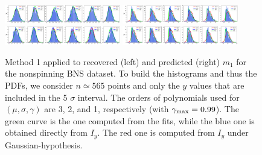 \documentclass[prd,aps,twocolumn,a4paper,showkeys,nofootinbib]{revtex4-1}
\def\Iy{{I_y}}
\begin{document}
\begin{figure}[t]
	\includegraphics[width=0.45\textwidth]{./FigsErr/v1_BNS_rec_m1_distr3.png}
	\hspace{0.8cm}
	\includegraphics[width=0.45\textwidth]{./FigsErr/v1_BNS_pred_m1_distr3.png} \\
	
	\includegraphics[width=0.45\textwidth]{./FigsErr/v1_BNS_rec_m1_distr4.png}
	\hspace{0.8cm}
	\includegraphics[width=0.45\textwidth]{./FigsErr/v1_BNS_pred_m1_distr4.png} 
	\caption{\label{fig:approach1_BNS} Method 1 applied to recovered (left) and predicted (right) $m_1$ for the 
		nonspinning BNS dataset. To build the histograms and thus the PDFs, we consider $n\simeq 565$ points and only 
		the $y$ values that are included in the 5 $\sigma$ interval. The orders of polynomials
		used for $(\mu,\sigma,\gamma)$ are 3, 2, and 1, respectively (with $\gamma_{\rm max}=0.99$).
		The green curve is the one computed 
		from the fits, while the blue one is obtained directly from $\Iy$. The red one is computed from $\Iy$ 
		under Gaussian-hypothesis. }
\end{figure}
\end{document}
